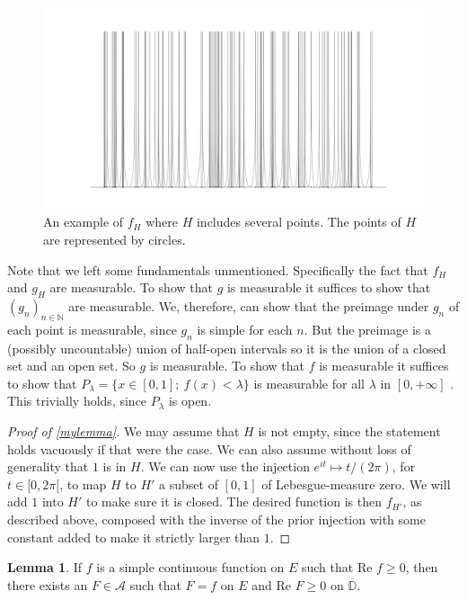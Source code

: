 \documentclass[a4paper,12pt,twoside,BCOR=10mm]{scrbook}
\theoremstyle{definition}
\theoremstyle{definition}
\newtheorem{lemma}[theorem]{Lemma}
\theoremstyle{definition}
\renewcommand{\Re}{\text{Re }}
\begin{document}
\begin{figure}[h]
\centering
\includegraphics[width=1\textwidth]{graph101}
\caption{An example of $f_H$ where $H$ includes several points. The points of $H$ are represented by circles. }
\end{figure}
Note that we left some fundamentals unmentioned.
Specifically the fact that $f_H$ and $g_H$ are measurable.
To show that $g$ is measurable it suffices to show that $(g_n)_{n \in \mathbb{N}}$ are measurable.
We, therefore, can show that the preimage under $g_n$ of each point is measurable, since $g_n$ is simple for each $n$.
But the preimage is a (possibly uncountable) union of half-open intervals so it is the union of a closed set and an open set.
So $g$ is measurable.
To show that $f$ is measurable it suffices to show that $P_{\lambda} = \{x \in [0, 1];\ f(x) < \lambda\}$ is measurable for all $\lambda$ in $[0, +\infty]$ \citep[lemma $1.3.9$]{tao}.
This trivially holds, since $P_{\lambda}$ is open.
\begin{proof}[Proof of \ref{mylemma}]
We may assume that $H$ is not empty, since the statement holds vacuously if that were the case.
We can also assume without loss of generality that $1$ is in $H$.
We can now use the injection $e^{it} \mapsto t/(2\pi)$, for $t \in [0, 2\pi[$,  to map $H$ to $H'$ a subset of $[0, 1]$ of Lebesgue-measure zero.
We will add $1$ into $H'$ to make sure it is closed.
The desired function is then $f_{H'}$, as described above, composed with the inverse of the prior injection with some constant added to make it strictly larger than $1$.
\end{proof}
\begin{lemma}
\label{rudinlemma1}
If $f$ is a simple continuous function on $E$ such that $\Re f \geq 0$, then there exists an $F \in \mathcal{A}$ such that $F = f$ on $E$ and $\Re F \geq 0$ on $\overline{\mathbb{D}}$.
\end{lemma}
\end{document}
